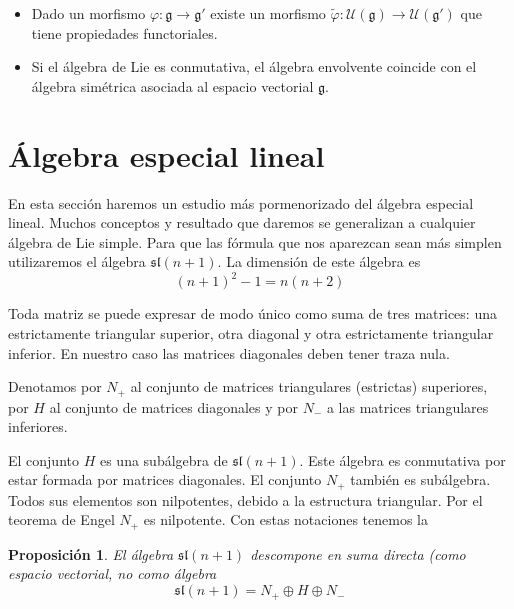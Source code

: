 \documentclass[a4paper,draft,12pt]{article}
\newtheorem{propo}[teo]{Proposición}%
\newcommand{\uni}{\mathcal{U}}%
\begin{document}
\bigskip
{}

\begin{itemize}

\item Dado un morfismo $\varphi: \mathfrak{g}\rightarrow \mathfrak{g}'$ existe un morfismo $\tilde \varphi: \uni(\mathfrak{g}) \rightarrow \uni(\mathfrak{g}')$ que tiene propiedades functoriales.

\item Si el álgebra de Lie es conmutativa, el álgebra envolvente coincide con el álgebra simétrica asociada al espacio vectorial $\mathfrak{g}$.

\end{itemize}

\newpage

\section{Álgebra especial lineal}

En esta sección haremos un estudio más pormenorizado del álgebra especial lineal.  Muchos conceptos y resultado que daremos se generalizan a cualquier álgebra de Lie simple.  Para que las fórmula que nos aparezcan sean más simplen utilizaremos el álgebra $\mathfrak{sl}(n+1)$.  La dimensión de este álgebra es
$$
(n+1)^2-1= n(n+2)
$$

\bigskip

Toda matriz se puede expresar de modo único como suma de tres matrices: una estrictamente triangular superior, otra diagonal y otra estrictamente triangular inferior. En nuestro caso las matrices diagonales deben tener traza nula.

Denotamos por $N_+$ al conjunto de matrices triangulares (estrictas) superiores, por $H$ al conjunto de matrices diagonales y por $N_-$ a las matrices triangulares inferiores.

El conjunto $H$ es una subálgebra de $\mathfrak{sl}(n+1)$.  Este álgebra es conmutativa por estar formada por matrices diagonales.  El conjunto $N_+$ también es subálgebra.  Todos sus elementos son nilpotentes, debido a la estructura triangular.  Por el teorema de Engel $N_+$ es nilpotente.  Con estas notaciones tenemos la

\begin{propo}El álgebra $\mathfrak{sl}(n+1)$ descompone en suma directa (como espacio vectorial, no como  álgebra
$$
\mathfrak{sl}(n+1)= N_+ \oplus H \oplus N_-
$$

\end{propo}
\end{document}
